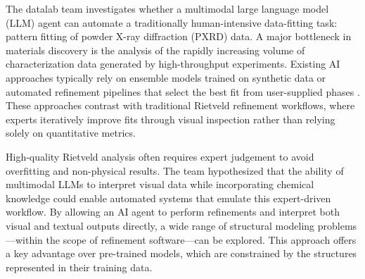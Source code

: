 

The datalab team investigates whether a multimodal large language model (LLM) agent can automate a traditionally human-intensive data-fitting task: pattern fitting of powder X-ray diffraction (PXRD) data. A major bottleneck in materials discovery is the analysis of the rapidly increasing volume of characterization data generated by high-throughput experiments. Existing AI approaches typically rely on ensemble models trained on synthetic data or automated refinement pipelines that select the best fit from user-supplied phases \cite{Szymanski2021, Szymanski2023, Chang2025}. These approaches contrast with traditional Rietveld refinement workflows, where experts iteratively improve fits through visual inspection rather than relying solely on quantitative metrics.

High-quality Rietveld analysis often requires expert judgement to avoid overfitting and non-physical results. The team hypothesized that the ability of multimodal LLMs to interpret visual data while incorporating chemical knowledge could enable automated systems that emulate this expert-driven workflow. By allowing an AI agent to perform refinements and interpret both visual and textual outputs directly, a wide range of structural modeling problems—within the scope of refinement software—can be explored. This approach offers a key advantage over pre-trained models, which are constrained by the structures represented in their training data.

